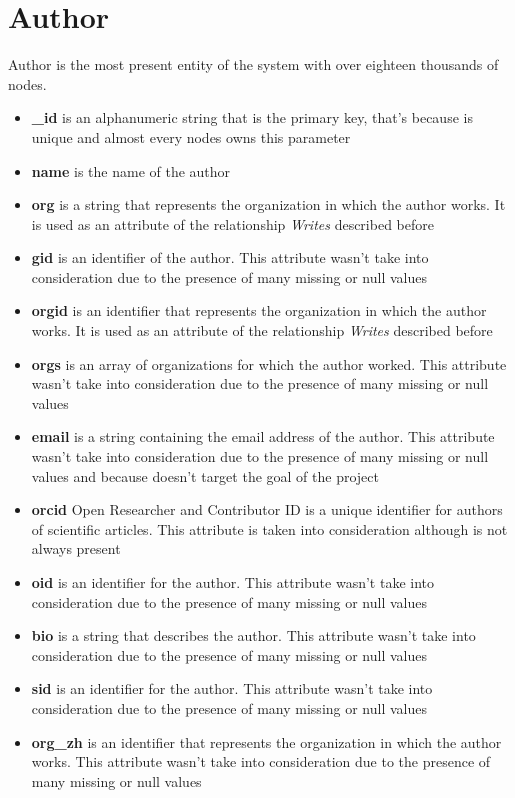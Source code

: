 \documentclass{Configuration_Files/PoliMi3i_thesis}
\begin{document}
\section{Author}
Author is the most present entity of the system with over eighteen thousands of nodes.
\begin{itemize}
    \item \textbf{\_id} is an alphanumeric string that is the primary key, that's because is unique and almost every nodes
            owns this parameter
    \item \textbf{name} is the name of the author
    \item \textbf{org} is a string that represents the organization in which the author works. It is used as an attribute 
            of the relationship \emph{Writes} described before
    \item \textbf{gid} is an identifier of the author. This attribute wasn't take into consideration due to the presence
            of many missing or null values
    \item \textbf{orgid} is an identifier that represents the organization in which the author works. It is used as an 
            attribute of the relationship \emph{Writes} described before
    \item \textbf{orgs} is an array of organizations for which the author worked. This attribute wasn't take into 
            consideration due to the presence of many missing or null values
    \item \textbf{email} is a string containing the email address of the author. This attribute wasn't take into
            consideration due to the presence of many missing or null values and because doesn't target the goal of the 
            project
    \item \textbf{orcid} Open Researcher and Contributor ID is a unique identifier for authors of scientific articles.
            This attribute is taken into consideration although is not always present
    \item \textbf{oid} is an identifier for the author. This attribute wasn't take into consideration due to the
            presence of many missing or null values
    \item \textbf{bio} is a string that describes the author. This attribute wasn't take into consideration due to 
            the presence of many missing or null values   
    \item \textbf{sid} is an identifier for the author. This attribute wasn't take into consideration due to the
            presence of many missing or null values
    \item \textbf{org\_zh} is an identifier that represents the organization in which the author works. This attribute
            wasn't take into consideration due to the presence of many missing or null values
\end{itemize}
\end{document}
